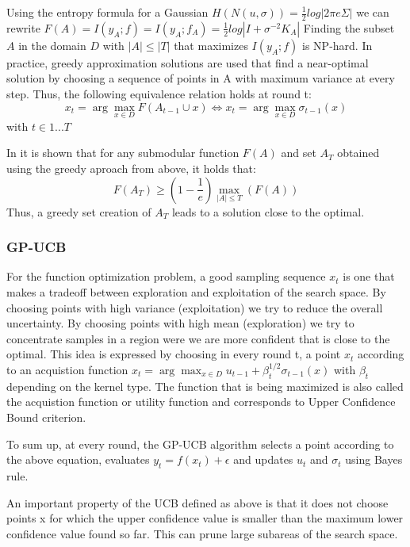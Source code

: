 \documentclass[10pt,journal,a4paper]{IEEEtran}
\begin{document}
Using the entropy formula for a Gaussian $H(N(u,\sigma)) =\frac{1}{2}log|2\pi e \Sigma|$ we can rewrite $F(A) =I(y_A; f)  = I(y_A; f_A) = \frac{1}{2} log|I + \sigma^{-2} K_A|$
Finding the subset $A$ in the domain $D$ with $|A| \leq |T|$ that maximizes $I(y_A; f)$ is NP-hard. In practice, greedy approximation solutions are used that find a near-optimal solution by choosing a sequence of points in A with maximum variance at every step. Thus, the following equivalence relation holds at round t:
\begin{equation}
x_t = \arg\max_{x\in D} F(A_{t-1}\cup {x}) \Longleftrightarrow 
x_t = \arg\max_{x\in D}\sigma_{t-1}(x) 
\end{equation}
with $t\in{1...T}$

In \cite{nemhauser1978analysis} it is shown that for any submodular function $F(A)$ and set
$A_T$ obtained using the greedy aproach from above, it holds that:
\begin{equation}
	F(A_T) \geq (1-\frac{1}{e}) \max_{|A| \leq T}(F(A))
\end{equation}
Thus, a greedy set creation of $A_T$ leads to a solution close to the optimal.

\subsubsection{GP-UCB}
For the function optimization problem, a good sampling sequence $x_t$ is one that makes a tradeoff between 
exploration and exploitation of the search space. By choosing points with high variance (exploitation) we try to reduce the overall uncertainty.
By choosing points with high mean (exploration) we try to concentrate samples in a region were we are more confident that is close to the optimal. This idea is expressed by choosing in every round t, a point $x_t$  according to an acquistion function 
$x_t = \arg\max_{x\in D} u_{t-1} + \beta_{t}^{1/2}\sigma_{t-1}(x)$ with $\beta_{t}$ depending on the kernel type. The function that is being maximized is also called the acquistion function or utility function and corresponds to Upper Confidence Bound criterion.

To sum up, at every round, the GP-UCB algorithm selects a point according to the above equation, evaluates $y_t=f(x_t) + \epsilon$ and updates $u_t$ and $\sigma_t$ using Bayes rule.

An important property of the UCB defined as above is that it does not choose points x for which the upper confidence value is smaller than the maximum lower confidence value found so far. This can prune large subareas of the search space.
\end{document}
